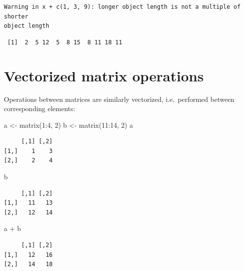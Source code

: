 \documentclass[
]{book}
\newenvironment{Shaded}{\begin{snugshade}}{\end{snugshade}}
\newcommand{\DecValTok}[1]{\textcolor[rgb]{0.00,0.00,0.81}{#1}}
\newcommand{\FunctionTok}[1]{\textcolor[rgb]{0.00,0.00,0.00}{#1}}
\newcommand{\NormalTok}[1]{#1}
\newcommand{\OtherTok}[1]{\textcolor[rgb]{0.56,0.35,0.01}{#1}}
\newcommand{\SpecialCharTok}[1]{\textcolor[rgb]{0.00,0.00,0.00}{#1}}
\begin{document}
\begin{verbatim}
Warning in x + c(1, 3, 9): longer object length is not a multiple of shorter
object length
\end{verbatim}

\begin{verbatim}
 [1]  2  5 12  5  8 15  8 11 18 11
\end{verbatim}

\hypertarget{vectorized-matrix-operations}{%
\section{Vectorized matrix operations}\label{vectorized-matrix-operations}}

Operations between matrices are similarly vectorized, i.e.~performed between corresponding elements:

\begin{Shaded}
\begin{Highlighting}[]
\NormalTok{a }\OtherTok{\textless{}{-}} \FunctionTok{matrix}\NormalTok{(}\DecValTok{1}\SpecialCharTok{:}\DecValTok{4}\NormalTok{, }\DecValTok{2}\NormalTok{)}
\NormalTok{b }\OtherTok{\textless{}{-}} \FunctionTok{matrix}\NormalTok{(}\DecValTok{11}\SpecialCharTok{:}\DecValTok{14}\NormalTok{, }\DecValTok{2}\NormalTok{)}
\NormalTok{a}
\end{Highlighting}
\end{Shaded}

\begin{verbatim}
     [,1] [,2]
[1,]    1    3
[2,]    2    4
\end{verbatim}

\begin{Shaded}
\begin{Highlighting}[]
\NormalTok{b}
\end{Highlighting}
\end{Shaded}

\begin{verbatim}
     [,1] [,2]
[1,]   11   13
[2,]   12   14
\end{verbatim}

\begin{Shaded}
\begin{Highlighting}[]
\NormalTok{a }\SpecialCharTok{+}\NormalTok{ b}
\end{Highlighting}
\end{Shaded}

\begin{verbatim}
     [,1] [,2]
[1,]   12   16
[2,]   14   18
\end{verbatim}
\end{document}
